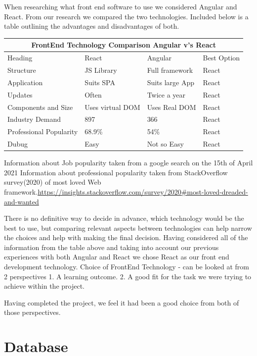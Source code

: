 When researching what front end software to use we considered Angular and React. From our research we compared the two technologies. Included below is a table outlining the advantages and disadvantages of both.
\begin{table}[h!]
\centering
\begin{tabular}{ |p{3cm}||p{3cm}|p{3cm}|p{3cm}| }
 \hline
 \multicolumn{4}{|c|}{FrontEnd Technology Comparison Angular v's React} \\

 \hline
 Heading& React& Angular&Best Option\\
 \hline
 Structure   & JS Library    &Full framework &  React\\
 Application & Suits SPA    & Suits large App   &React\\
 Updates &Often & Twice a year&  React\\
 Components and Size    &Uses virtual DOM & Uses Real DOM&  React\\
 Industry Demand&   897  & 366& React\\
 Professional Popularity& 68.9\% &54\%   &React\\
 Dubug& Easy& Not so Easy& React\\
 
 \hline
\end{tabular}
\end{table}

\hfill \break


Information about Job popularity taken from a google search on the 15th of April 2021
Information about professional popularity taken from StackOverflow survey(2020) of most loved Web framework.\url{https://insights.stackoverflow.com/survey/2020#most-loved-dreaded-and-wanted}


There is no definitive way to decide in advance, which technology would be the best to use, but comparing relevant aspects between technologies can help narrow the choices and help with making the final decision. Having considered all of the information from the table above and taking into account our previous experiences with both Angular and React we chose React as our front end development technology.
Choice of FrontEnd Technology - can be looked at from 2 perspectives 1. A learning outcome.
2. A good fit for the task we were trying to achieve within the project.

Having completed the project, we feel it had been a good choice from both of those perspectives. 
\section{Database}
